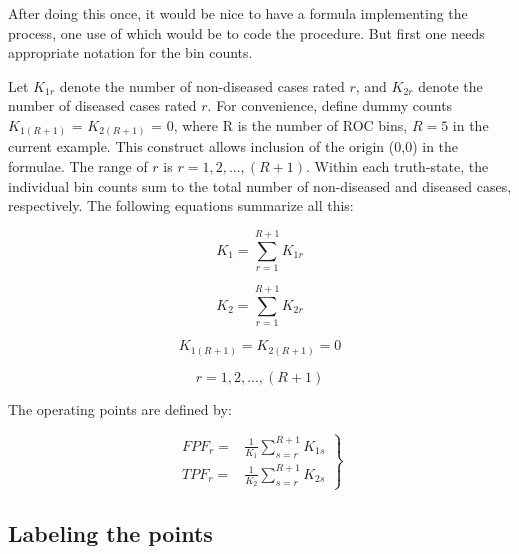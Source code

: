\documentclass[
]{book}
\begin{document}
After doing this once, it would be nice to have a formula implementing the process, one use of which would be to code the procedure. But first one needs appropriate notation for the bin counts.

Let \(K_{1r}\) denote the number of non-diseased cases rated \(r\), and \(K_{2r}\) denote the number of diseased cases rated \(r\). For convenience, define dummy counts \(K_{1{(R+1)}}\) = \(K_{2{(R+1)}}\) = 0, where R is the number of ROC bins, \(R = 5\) in the current example. This construct allows inclusion of the origin (0,0) in the formulae. The range of \(r\) is \(r = 1,2,...,(R+1)\). Within each truth-state, the individual bin counts sum to the total number of non-diseased and diseased cases, respectively. The following equations summarize all this:

\begin{equation*} 
K_1=\sum_{r=1}^{R+1}K_{1r}
\end{equation*}

\begin{equation*} 
K_2=\sum_{r=1}^{R+1}K_{2r}
\end{equation*}

\begin{equation*} 
K_{1{(R+1)}} = K_{2{(R+1)}} = 0
\end{equation*}

\begin{equation*} 
r = 1,2,...,(R+1)
\end{equation*}

The operating points are defined by:

\begin{equation}
\left. 
\begin{aligned}
FPF_r=& \frac {1} {K_1} \sum_{s=r}^{R+1}K_{1s}\\
TPF_r=& \frac {1} {K_2} \sum_{s=r}^{R+1}K_{2s}
\end{aligned}
\right \}
\label{eq:ratingsParadigm-FPF-TPF-from-counts}
\end{equation}

\hypertarget{labeling-the-points}{%
\subsection{Labeling the points}\label{labeling-the-points}}
\end{document}
